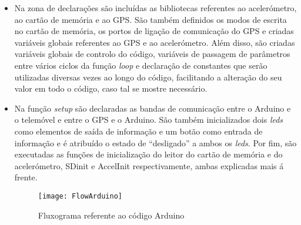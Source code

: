 \begin{itemize}
\item Na zona de declarações são incluídas as bibliotecas referentes ao acelerómetro, ao cartão de memória e ao GPS.
São também definidos os modos de escrita no cartão de memória, os portos de ligação de comunicação do GPS e criadas variáveis globais referentes ao GPS e ao acelerómetro.
Além disso, são criadas variáveis globais de controlo do código, variáveis de passagem de parâmetros entre vários ciclos da função \emph{loop} e declaração de constantes que serão utilizadas diversas vezes ao longo do código, facilitando a alteração do seu valor em todo o código, caso tal se mostre necessário.

\item Na função \emph{setup} são declaradas as bandas de comunicação entre o Arduino e o telemóvel e entre o GPS e o Arduino.
São também inicializados dois \emph{leds} como elementos de saída de informação e um botão como entrada de informação e é atribuído o estado de “desligado” a ambos os \emph{leds}.
Por fim, são executadas as funções de inicialização do leitor do cartão de memória e do acelerómetro, SD\textunderscore init e AccelInit respectivamente, ambas explicadas mais á frente.

\begin{figure}[hbtp]
	\centering
	\texttt{[image: FlowArduino]}
	\caption{Fluxograma referente ao código Arduino}
	\label{fig:Fluxograma_referente_ao_código_arduino}
\end{figure}


\end{itemize}
